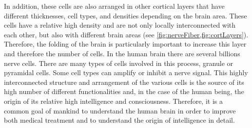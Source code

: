 In addition, these cells are also arranged in other cortical layers that have different thicknesses, cell types, and densities depending on the brain area.
These cells have a relative high density and are not only locally interconnected with each other, but also with different brain areas (see \cref{fig:nerveFiber,fig:cortLayers}).
Therefore, the folding of the brain is particularly important to increase this layer and therefore the number of cells.
In the human brain there are several billions nerve cells.
There are many types of cells involved in this process, \eg{} granule or pyramidal cells.
Some cell types can amplify or inhibit a nerve signal.
This highly interconnected structure and arrangement of the various cells is the source of its high number of different functionalities and, in the case of the human being, the origin of its relative high intelligence and consciousness.
Therefore, it is a common goal of mankind to understand the human brain in order to improve both medical treatment and to understand the origin of intelligence in detail.
%
%
%
